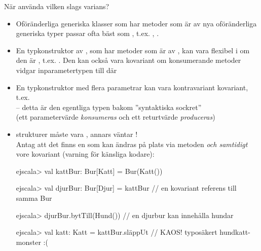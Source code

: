 \begin{Slide}{När använda vilken slags varians?}
\begin{itemize}\SlideFontTiny
\item Oföränderliga generiska klasser som har metoder som är  av nya oföränderliga generiska typer passar ofta bäst som , t.ex. ,  . 
\item En typkonstruktor av , som har metoder som är  av , kan vara flexibel i  om den är , t.ex. . Den kan också vara kovariant om konsumerande metoder vidgar inparametertypen till  där 
\item En typkonstruktor med flera parametrar kan vara  kontravariant  kovariant, t.ex.  \\-- detta är den egentliga typen bakom ''syntaktiska sockret'' \\
(ett parametervärde \emph{konsumeras} och ett returtvärde \emph{produceras})
\item {} strukturer måste vara , annars väntar !\\
\pause Antag att det finns en  som kan ändras på plats via metoden  \emph{och samtidigt} vore kovariant (varning för känsliga kodare): 
\begin{REPLsmall}
ejscala> val kattBur: Bur[Katt] = Bur(Katt())

ejscala> val djurBur: Bur[Djur] = kattBur  // en kovariant referens till samma Bur

ejscala> djurBur.bytTill(Hund())           // en djurbur kan innehålla hundar

ejscala> val katt: Katt = kattBur.släppUt  // KAOS! typosäkert hundkatt-monster :(
\end{REPLsmall}
\end{itemize}
\end{Slide}



